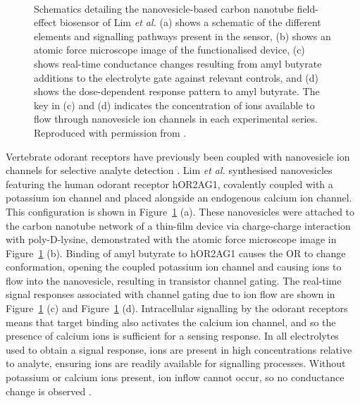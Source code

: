 \documentclass[
  a4paper,
]{scrbook}
\begin{document}
\begin{figure}
\begin{minipage}[t]{0.45\linewidth}
{{}

}

\end{minipage}%
%
\begin{minipage}[t]{0.01\linewidth}

{\centering 

~

}

\end{minipage}%

\caption{\label{fig-lim-ion-channel}Schematics detailing the
nanovesicle-based carbon nanotube field-effect biosensor of Lim \emph{et
al.} (a) shows a schematic of the different elements and signalling
pathways present in the sensor, (b) shows an atomic force microscope
image of the functionalised device, (c) shows real-time conductance
changes resulting from amyl butyrate additions to the electrolyte gate
against relevant controls, and (d) shows the dose-dependent response
pattern to amyl butyrate. The key in (c) and (d) indicates the
concentration of ions available to flow through nanovesicle ion channels
in each experimental series. Reproduced with permission from
\autocite{Lim2015}.}

\end{figure}

Vertebrate odorant receptors have previously been coupled with
nanovesicle ion channels for selective analyte detection
\autocite{Lim2015,Dung2018}. Lim \emph{et al.} synthesised nanovesicles
featuring the human odorant receptor hOR2AG1, covalently coupled with a
potassium ion channel and placed alongside an endogenous calcium ion
channel. This configuration is shown in Figure~\ref{fig-lim-ion-channel}
(a). These nanovesicles were attached to the carbon nanotube network of
a thin-film device via charge-charge interaction with poly-D-lysine,
demonstrated with the atomic force microscope image in
Figure~\ref{fig-lim-ion-channel} (b). Binding of amyl butyrate to
hOR2AG1 causes the OR to change conformation, opening the coupled
potassium ion channel and causing ions to flow into the nanovesicle,
resulting in transistor channel gating. The real-time signal responses
associated with channel gating due to ion flow are shown in
Figure~\ref{fig-lim-ion-channel} (c) and
Figure~\ref{fig-lim-ion-channel} (d). Intracellular signalling by the
odorant receptors means that target binding also activates the calcium
ion channel, and so the presence of calcium ions is sufficient for a
sensing response. In all electrolytes used to obtain a signal response,
ions are present in high concentrations relative to analyte, ensuring
ions are readily available for signalling processes. Without potassium
or calcium ions present, ion inflow cannot occur, so no conductance
change is observed \autocite{Lim2015}.
\end{document}
